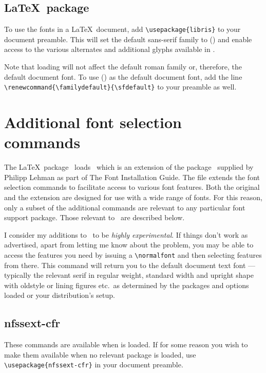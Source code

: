 \documentclass[11pt,british]{article}
\begin{document}
\subsection{\LaTeX\ package}

To use the fonts in a \LaTeX\ document, add \verb|\usepackage{libris}| to your document preamble. This will set the default sans-serif family to  () and enable access to the various alternates and additional glyphs available in .

Note that loading  will not affect the default roman family or, therefore, the default document font. To use  () as the default document font, add the line \verb|\renewcommand{\familydefault}{\sfdefault}| to your preamble as well.
	
\section{Additional font selection commands}\label{sec:commands}

	The \LaTeX\ package \ loads \ which is an extension of the package \ supplied by Philipp Lehman as part of The Font Installation Guide. The file extends the font selection commands to facilitate access to various font features. Both the original and the extension are designed for use with a wide range of fonts. For this reason, only a subset of the additional commands are relevant to any particular font support package. Those relevant to \ are described below.
	
	I consider my additions to \ to be \emph{highly experimental}. If things don't work as advertised, apart from letting me know about the problem, you may be able to access the features you need by issuing a \verb|\normalfont| and then selecting features from there. This command will return you to the default document text font --- typically the relevant serif in regular weight, standard width and upright shape with oldstyle or lining figures etc.\ as determined by the packages and options loaded or your distribution's setup.
	
\subsection{nfssext-cfr}

These commands are available when  is loaded. If for some reason you wish to make them available when no relevant package is loaded, use \verb|\usepackage{nfssext-cfr}| in your document preamble.
	
\end{document}

